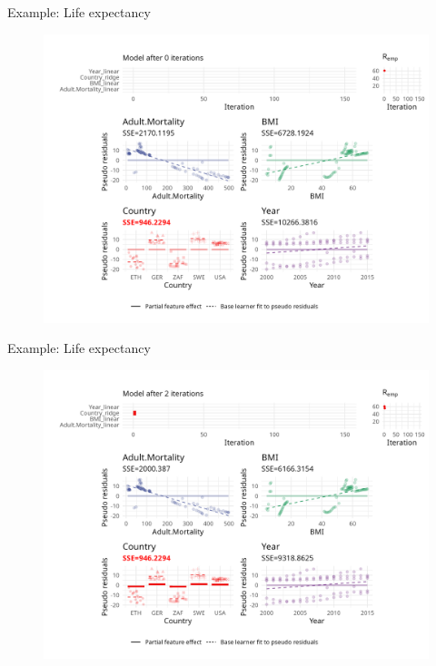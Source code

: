 
\begin{frame}{Example: Life expectancy}
	\begin{figure}
		\centering
		\includegraphics[width=\textwidth]{figure/cwb-anim/fig-iter-0001.png}
	\end{figure}
	\addtocounter{framenumber}{0}
\end{frame}


\begin{frame}{Example: Life expectancy}
	\begin{figure}
		\centering
		\includegraphics[width=\textwidth]{figure/cwb-anim/fig-iter-0002.png}
	\end{figure}
	\addtocounter{framenumber}{-1}
\end{frame}


